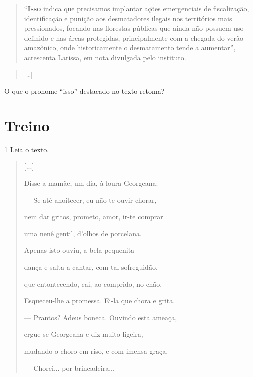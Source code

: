 \begin{quote}
``\textbf{Isso} indica que precisamos implantar ações emergenciais de
fiscalização, identificação e punição aos desmatadores ilegais nos
territórios mais pressionados, focando nas florestas públicas que ainda
não possuem uso definido e nas áreas protegidas, principalmente com a
chegada do verão amazônico, onde historicamente o desmatamento tende a
aumentar'', acrescenta Larissa, em nota divulgada pelo instituto.
\end{quote}

\begin{quote}
{[}\ldots{]}
\end{quote}


O que o pronome ``isso'' destacado no texto retoma?


\section{Treino}

\num{1} Leia o texto.

\begin{quote}
{[}...{]}

Disse a mamãe, um dia, à loura Georgeana:

--- Se até anoitecer, eu não te ouvir chorar,

nem dar gritos, prometo, amor, ir-te comprar

uma nenê gentil, d'olhos de porcelana.

Apenas isto ouviu, a bela pequenita

dança e salta a cantar, com tal sofreguidão,

que entontecendo, cai, ao comprido, no chão.

Esqueceu-lhe a promessa. Ei-la que chora e grita.

--- Prantos? Adeus boneca. Ouvindo esta ameaça,

ergue-se Georgeana e diz muito ligeira,

mudando o choro em riso, e com imensa graça.

--- Chorei... por brincadeira...
\end{quote}

